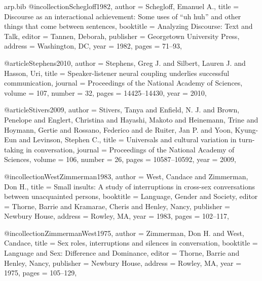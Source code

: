 \begin{filecontents*}[overwrite]{arp.bib}
@incollection{Schegloff1982,
  author    = {Schegloff, Emanuel A.},
  title     = {Discourse as an interactional achievement: Some uses of ``uh huh'' and other things that come between sentences},
  booktitle = {Analyzing Discourse: Text and Talk},
  editor    = {Tannen, Deborah},
  publisher = {Georgetown University Press},
  address   = {Washington, DC},
  year      = {1982},
  pages     = {71--93},
}

@article{Stephens2010,
  author  = {Stephens, Greg J. and Silbert, Lauren J. and Hasson, Uri},
  title   = {Speaker-listener neural coupling underlies successful communication},
  journal = {Proceedings of the National Academy of Sciences},
  volume  = {107},
  number  = {32},
  pages   = {14425--14430},
  year    = {2010},
}

@article{Stivers2009,
  author  = {Stivers, Tanya and Enfield, N. J. and Brown, Penelope and Englert, Christina and Hayashi, Makoto and Heinemann, Trine and Hoymann, Gertie and Rossano, Federico and de Ruiter, Jan P. and Yoon, Kyung-Eun and Levinson, Stephen C.},
  title   = {Universals and cultural variation in turn-taking in conversation},
  journal = {Proceedings of the National Academy of Sciences},
  volume  = {106},
  number  = {26},
  pages   = {10587--10592},
  year    = {2009},
}

@incollection{WestZimmerman1983,
  author    = {West, Candace and Zimmerman, Don H.},
  title     = {Small insults: A study of interruptions in cross-sex conversations between unacquainted persons},
  booktitle = {Language, Gender and Society},
  editor    = {Thorne, Barrie and Kramarae, Cheris and Henley, Nancy},
  publisher = {Newbury House},
  address   = {Rowley, MA},
  year      = {1983},
  pages     = {102--117},
}

@incollection{ZimmermanWest1975,
  author    = {Zimmerman, Don H. and West, Candace},
  title     = {Sex roles, interruptions and silences in conversation},
  booktitle = {Language and Sex: Difference and Dominance},
  editor    = {Thorne, Barrie and Henley, Nancy},
  publisher = {Newbury House},
  address   = {Rowley, MA},
  year      = {1975},
  pages     = {105--129},
}
\end{filecontents*}

\documentclass[11pt,letterpaper]{article}
\usepackage[margin=1in]{geometry}
\usepackage{setspace}
\usepackage{microtype}
\usepackage{titlesec}
\usepackage{enumitem}
\usepackage{parskip}
\usepackage[hidelinks]{hyperref}
\usepackage{tikz}
\usetikzlibrary{arrows.meta,positioning,calc}
\usepackage{natbib}


